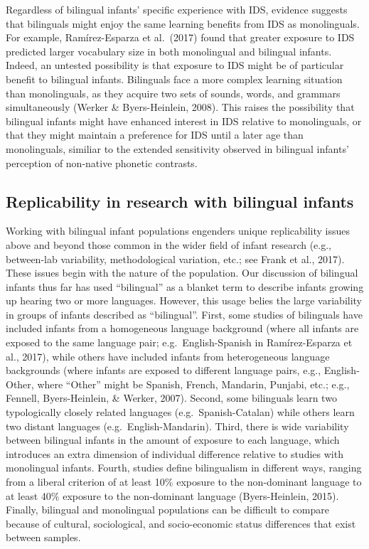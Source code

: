 \documentclass[,man,floatsintext]{apa6}
\begin{document}
Regardless of bilingual infants' specific experience with IDS, evidence suggests that bilinguals might enjoy the same learning benefits from IDS as monolinguals. For example, Ramírez-Esparza et al.~(2017) found that greater exposure to IDS predicted larger vocabulary size in both monolingual and bilingual infants. Indeed, an untested possibility is that exposure to IDS might be of particular benefit to bilingual infants. Bilinguals face a more complex learning situation than monolinguals, as they acquire two sets of sounds, words, and grammars simultaneously (Werker \& Byers-Heinlein, 2008). This raises the possibility that bilingual infants might have enhanced interest in IDS relative to monolinguals, or that they might maintain a preference for IDS until a later age than monolinguals, similiar to the extended sensitivity observed in bilingual infants' perception of non-native phonetic contrasts.

\hypertarget{replicability-in-research-with-bilingual-infants}{%
\subsection{Replicability in research with bilingual infants}\label{replicability-in-research-with-bilingual-infants}}

Working with bilingual infant populations engenders unique replicability issues above and beyond those common in the wider field of infant research (e.g., between-lab variability, methodological variation, etc.; see Frank et al., 2017). These issues begin with the nature of the population. Our discussion of bilingual infants thus far has used \enquote{bilingual} as a blanket term to describe infants growing up hearing two or more languages. However, this usage belies the large variability in groups of infants described as \enquote{bilingual}. First, some studies of bilinguals have included infants from a homogeneous language background (where all infants are exposed to the same language pair; e.g.~English-Spanish in Ramírez-Esparza et al., 2017), while others have included infants from heterogeneous language backgrounds (where infants are exposed to different language pairs, e.g., English-Other, where ``Other'' might be Spanish, French, Mandarin, Punjabi, etc.; e.g., Fennell, Byers-Heinlein, \& Werker, 2007). Second, some bilinguals learn two typologically closely related languages (e.g.~Spanish-Catalan) while others learn two distant languages (e.g.~English-Mandarin). Third, there is wide variability between bilingual infants in the amount of exposure to each language, which introduces an extra dimension of individual difference relative to studies with monolingual infants. Fourth, studies define bilingualism in different ways, ranging from a liberal criterion of at least 10\% exposure to the non-dominant language to at least 40\% exposure to the non-dominant language (Byers-Heinlein, 2015). Finally, bilingual and monolingual populations can be difficult to compare because of cultural, sociological, and socio-economic status differences that exist between samples.
\end{document}
